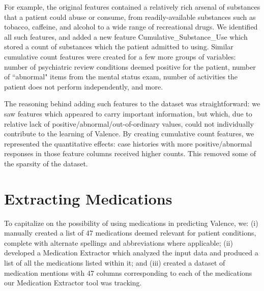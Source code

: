  For example, the original features contained a relatively rich arsenal of 
 substances that a patient could abuse or consume, from readily-available substances such as tobacco, caffeine, and alcohol to a wide range of recreational drugs. We identified all such features, and added a new feature
 \textsf{Cumulative\_Substance\_Use} which stored a count of substances which the patient
 admitted to using.  Similar cumulative count features were created for a few more 
 groups of variables: number of psychiatric review conditions deemed positive for the patient, number of ``abnormal" items from the mental status exam, number of activities
 the patient does not perform independently, and more.
 
 The reasoning behind adding such features to the dataset was straightforward: we saw features which appeared to carry important information, but which, due to relative lack of positive/abnormal/out-of-ordinary values, could not individually contribute to the learning of \textsf{Valence}. By creating cumulative count features, we represented the quantitative effects: case histories with more positive/abnormal responses in those feature columns received higher counts. This removed some of the sparsity of the dataset. 
 
 
 
 \section{Extracting Medications}  
 To capitalize on the possibility of using medications in predicting \textsf{Valence},
 we: (i)  manually created a list of 47 medications deemed relevant for
     patient conditions, complete with alternate spellings and abbreviations where applicable; (ii) developed a \textsf{Medication Extractor} which analyzed the input data and produced a list of all the medications listed within it; and (iii)
     created a dataset of medication mentions with 47 columns corresponding to each of the medications our \textsf{Medication Extractor} tool was tracking.     

